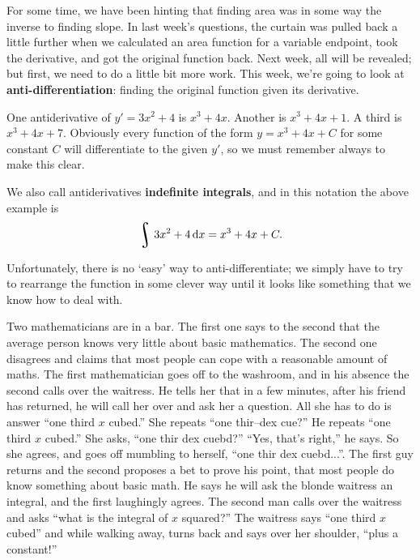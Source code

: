 


For some time, we have been hinting that finding area was in some way the inverse to finding slope. In last
week's questions, the curtain was pulled back a little further when we calculated an area function for a variable endpoint, took
the derivative, and got the original function back. Next week, all will be revealed; but first, we need to do a little bit more
work. This week, we're going to look at \textbf{anti-differentiation}: finding the original function given its derivative.

\begin{ex}
  One antiderivative of $ y' = 3x^2 + 4 $ is $ x^3 + 4x $. Another is $ x^3 + 4x + 1 $. A third is $ x^3 + 4x + 7 $. Obviously
  every function of the form $ y = x^3 + 4x + C $ for some constant $ C $ will differentiate to the given $ y' $, so we must remember
  always to make this clear.
\end{ex}

We also call antiderivatives \textbf{indefinite integrals}, and in this notation the above example is
\begin{displaymath}
  \rint 3x^2 + 4 \dif{x} = x^3 + 4x + C.
\end{displaymath}

Unfortunately, there is no `easy' way to anti-differentiate; we simply have to try to rearrange the function in some clever
way until it looks like something that we know how to deal with.

\begin{joke}
  Two mathematicians are in a bar. The first one says to the second that the average person knows very little about basic
  mathematics. The second one disagrees and claims that most people can cope with a reasonable amount of maths. The first
  mathematician goes off to the washroom, and in his absence the second calls over the waitress. He tells her that in a few
  minutes, after his friend has returned, he will call her over and ask her a question. All she has to do is answer ``one
  third $x$ cubed.'' She repeats ``one thir–dex cue?'' He repeats ``one third $x$ cubed.'' She asks, ``one thir dex cuebd?'' “Yes,
  that’s right,” he says. So she agrees, and goes off mumbling to herself, ``one thir dex cuebd...''. The first guy returns
  and the second proposes a bet to prove his point, that most people do know something about basic math. He says he will ask
  the blonde waitress an integral, and the first laughingly agrees. The second man calls over the waitress and asks ``what is
  the integral of $x$ squared?'' The waitress says ``one third $x$ cubed'' and while walking away, turns back and says over
  her shoulder, ``plus a constant!''
\end{joke}

